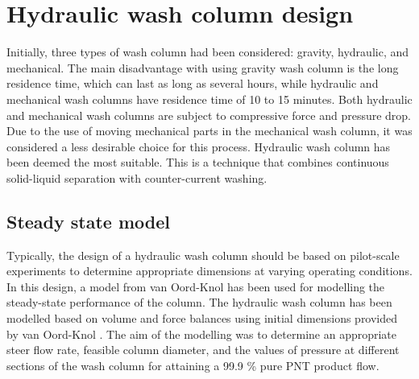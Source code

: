 \section{Hydraulic wash column design}\label{section: hydraulic wash column}

 Initially, three types of wash column had been considered: gravity, hydraulic, and mechanical. The main disadvantage with using gravity wash column is the long residence time, which can last as long as several hours, while hydraulic and mechanical wash columns have residence time of 10 to 15 minutes. Both hydraulic and mechanical wash columns are subject to compressive force and pressure drop. Due to the use of moving mechanical parts in the mechanical wash column, it was considered a less desirable choice for this process. Hydraulic wash column has been deemed the most suitable. This is a technique that combines continuous solid-liquid separation with counter-current washing. 

\subsection{Steady state model}   

Typically, the design of a hydraulic wash column should be based on pilot-scale experiments to determine appropriate dimensions at varying operating conditions. In this design, a model from van Oord-Knol \cite{van_oord-knol_hydraulic_2000} has been used for modelling the steady-state performance of the column. The hydraulic wash column has been modelled based on volume and force balances using initial dimensions provided by van Oord-Knol \cite{oordknol_dynamic_2002}. The aim of the modelling was to determine an appropriate steer flow rate, feasible column diameter, and the values of pressure at different sections of the wash column for attaining a 99.9 \% pure PNT product flow.  


